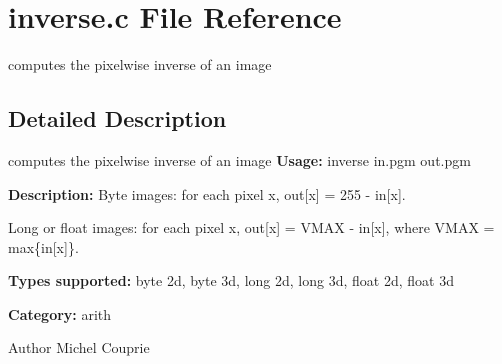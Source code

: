 \section{inverse.c File Reference}
\label{inverse_8c}


computes the pixelwise inverse of an image  




\subsection{Detailed Description}
computes the pixelwise inverse of an image {\bfseries Usage:} inverse in.pgm out.pgm

{\bfseries Description:} Byte images: for each pixel x, out[x] = 255 -\/ in[x].\par
 Long or float images: for each pixel x, out[x] = VMAX -\/ in[x], where VMAX = max\{in[x]\}.

{\bfseries Types supported:} byte 2d, byte 3d, long 2d, long 3d, float 2d, float 3d

{\bfseries Category:} arith

\begin{DoxyAuthor}{Author}
Michel Couprie 
\end{DoxyAuthor}
